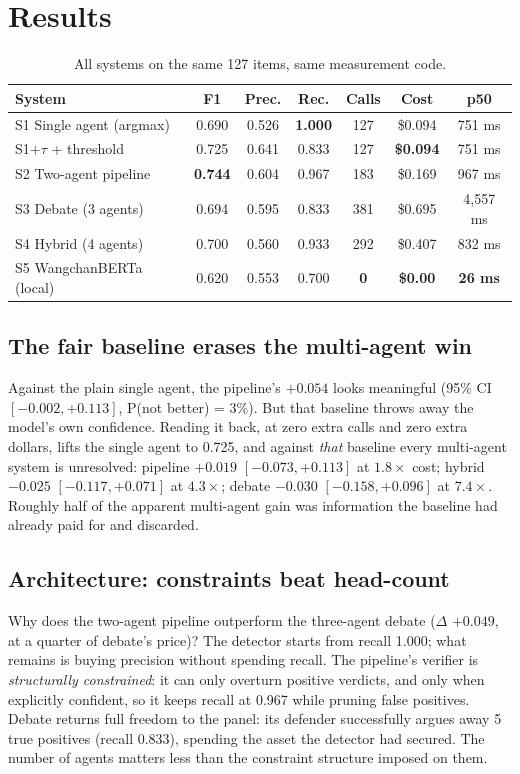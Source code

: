 \documentclass[10pt]{article}
\begin{document}
\section{Results}

\begin{table}[h]\centering\small
\begin{tabular}{lcccccc}
\toprule
System & F1 & Prec. & Rec. & Calls & Cost & p50 \\
\midrule
S1 Single agent (argmax) & 0.690 & 0.526 & \textbf{1.000} & 127 & \$0.094 & 751 ms \\
S1$+\tau$ + threshold & 0.725 & 0.641 & 0.833 & 127 & \textbf{\$0.094} & 751 ms \\
S2 Two-agent pipeline & \textbf{0.744} & 0.604 & 0.967 & 183 & \$0.169 & 967 ms \\
S3 Debate (3 agents) & 0.694 & 0.595 & 0.833 & 381 & \$0.695 & 4{,}557 ms \\
S4 Hybrid (4 agents) & 0.700 & 0.560 & 0.933 & 292 & \$0.407 & 832 ms \\
S5 WangchanBERTa (local) & 0.620 & 0.553 & 0.700 & \textbf{0} & \textbf{\$0.00} & \textbf{26 ms} \\
\bottomrule
\end{tabular}
\caption{All systems on the same 127 items, same measurement code.}
\end{table}

\subsection{The fair baseline erases the multi-agent win}
Against the plain single agent, the pipeline's $+0.054$ looks meaningful (95\% CI $[-0.002,
+0.113]$, P(not better) = 3\%). But that baseline throws away the model's own confidence. Reading it
back, at zero extra calls and zero extra dollars, lifts the single agent to 0.725, and against
\emph{that} baseline every multi-agent system is unresolved: pipeline $+0.019$ $[-0.073, +0.113]$ at
$1.8\times$ cost; hybrid $-0.025$ $[-0.117, +0.071]$ at $4.3\times$; debate $-0.030$ $[-0.158,
+0.096]$ at $7.4\times$. Roughly half of the apparent multi-agent gain was information the baseline
had already paid for and discarded.

\subsection{Architecture: constraints beat head-count}
Why does the two-agent pipeline outperform the three-agent debate ($\Delta$ $+0.049$, at a quarter
of debate's price)? The detector starts from recall 1.000; what remains is buying precision without
spending recall. The pipeline's verifier is \emph{structurally constrained}: it can only overturn
positive verdicts, and only when explicitly confident, so it keeps recall at 0.967 while pruning
false positives. Debate returns full freedom to the panel: its defender successfully argues away 5
true positives (recall 0.833), spending the asset the detector had secured. The number of agents
matters less than the constraint structure imposed on them.
\end{document}
